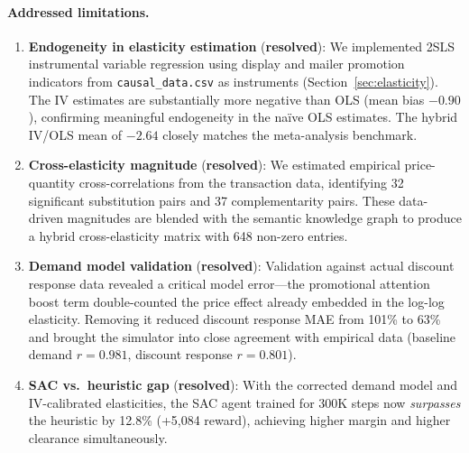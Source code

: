 \documentclass[11pt,a4paper]{article}
\begin{document}
\paragraph{Addressed limitations.}
\begin{enumerate}
    \item \textbf{Endogeneity in elasticity estimation} (\textbf{resolved}): We implemented 2SLS instrumental variable regression using display and mailer promotion indicators from \texttt{causal\_data.csv} as instruments (Section~\ref{sec:elasticity}).
    The IV estimates are substantially more negative than OLS (mean bias $-0.90$), confirming meaningful endogeneity in the na\"ive OLS estimates.
    The hybrid IV/OLS mean of $-2.64$ closely matches the \citet{bijmolt2005} meta-analysis benchmark.

    \item \textbf{Cross-elasticity magnitude} (\textbf{resolved}): We estimated empirical price-quantity cross-correlations from the transaction data, identifying 32 significant substitution pairs and 37 complementarity pairs.
    These data-driven magnitudes are blended with the semantic knowledge graph to produce a hybrid cross-elasticity matrix with 648 non-zero entries.

    \item \textbf{Demand model validation} (\textbf{resolved}): Validation against actual discount response data revealed a critical model error---the promotional attention boost term double-counted the price effect already embedded in the log-log elasticity.
    Removing it reduced discount response MAE from 101\% to 63\% and brought the simulator into close agreement with empirical data (baseline demand $r = 0.981$, discount response $r = 0.801$).

    \item \textbf{SAC vs.\ heuristic gap} (\textbf{resolved}): With the corrected demand model and IV-calibrated elasticities, the SAC agent trained for 300K steps now \emph{surpasses} the heuristic by 12.8\% (+5,084 reward), achieving higher margin and higher clearance simultaneously.
\end{enumerate}
\end{document}

